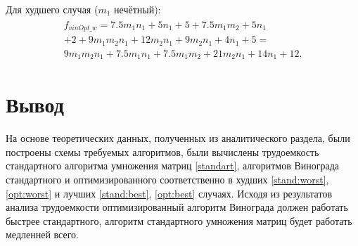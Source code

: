 Для худшего случая ($m_{1}$ нечётный): 
\begin{eqnarray}
	\label{opt:worst}
	\begin{aligned}
	f_{vinOpt\_w} = 7.5m_{1}n_{1} + 5n_{1} + 5 + 7.5m_{1}m_{2} + 5n_{1}\\ + 2 + 9m_{1}m_{2}n_{1} + 12m_{2}n_{1} + 9m_{2}n_{1} + 4n_{1} + 5 =\\ 9m_{1}m_{2}n_{1} + 7.5m_{1}n_{1} + 7.5m_{1}m_{2} + 21m_{2}n_{1} + 14n_{1} + 12.
\end{aligned}
\end{eqnarray}
\section*{Вывод}
На основе теоретических данных, полученных из аналитического раздела, были построены схемы требуемых алгоритмов, были вычислены трудоемкость стандартного алгоритма умножения матриц \ref{standart}, алгоритмов Винограда стандартного и оптимизированного соответственно в худших \ref{stand:worst}, \ref{opt:worst}  и лучших \ref{stand:best}, \ref{opt:best} случаях. Исходя из результатов анализа трудоемкости оптимизированный алгоритм Винограда должен работать быстрее стандартного, алгоритм стандартного умножения матриц будет работать медленней всего. 


